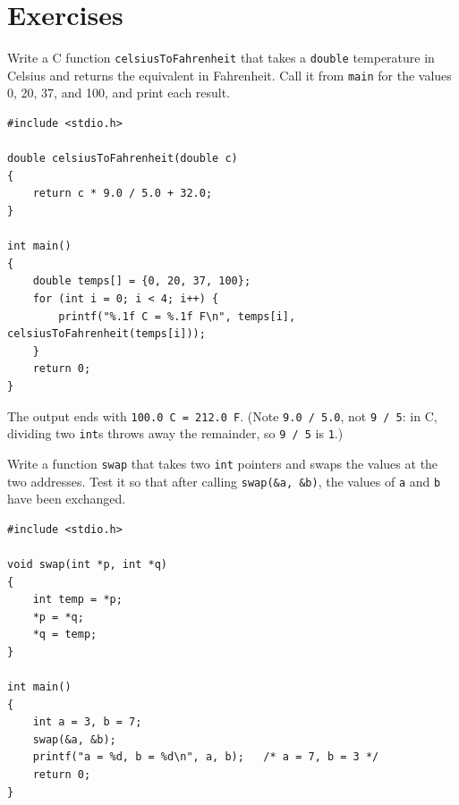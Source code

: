 \section{Exercises}

\begin{Exercise}[title={Temperature Conversion}, label=c_temp]
Write a C function \texttt{celsiusToFahrenheit} that takes a
\texttt{double} temperature in Celsius and returns the equivalent in
Fahrenheit. Call it from \texttt{main} for the values 0, 20, 37, and 100,
and print each result.
\end{Exercise}
\begin{Answer}[ref=c_temp]
\begin{verbatim}
#include <stdio.h>

double celsiusToFahrenheit(double c)
{
    return c * 9.0 / 5.0 + 32.0;
}

int main()
{
    double temps[] = {0, 20, 37, 100};
    for (int i = 0; i < 4; i++) {
        printf("%.1f C = %.1f F\n", temps[i], celsiusToFahrenheit(temps[i]));
    }
    return 0;
}
\end{verbatim}
The output ends with \texttt{100.0 C = 212.0 F}. (Note \texttt{9.0 / 5.0},
not \texttt{9 / 5}: in C, dividing two \texttt{int}s throws away the
remainder, so \texttt{9 / 5} is \texttt{1}.)
\end{Answer}

\begin{Exercise}[title={Swap}, label=c_swap]
Write a function \texttt{swap} that takes two \texttt{int} pointers and
swaps the values at the two addresses. Test it so that after calling
\texttt{swap(\&a, \&b)}, the values of \texttt{a} and \texttt{b} have
been exchanged.
\end{Exercise}
\begin{Answer}[ref=c_swap]
\begin{verbatim}
#include <stdio.h>

void swap(int *p, int *q)
{
    int temp = *p;
    *p = *q;
    *q = temp;
}

int main()
{
    int a = 3, b = 7;
    swap(&a, &b);
    printf("a = %d, b = %d\n", a, b);   /* a = 7, b = 3 */
    return 0;
}
\end{verbatim}
\end{Answer}

